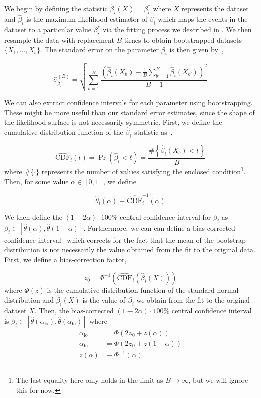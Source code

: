 We begin by defining the statistic $\hat{\beta}_i(X) = \beta_i^*$ where $X$ represents the dataset and $\hat{\beta}_i$ is the maximum likelihood estimator of $\beta_i$ which maps the events in the dataset to a particular value $\beta_i^*$ via the fitting process we described in . We then resample the data with replacement $B$ times to obtain bootstrapped datasets $\{X_1,\ldots,X_b\}$. The standard error on the parameter $\beta_i$ is then given by~\cite{Efron1981},

\begin{equation}
  \hat{\sigma}_{\beta_i}^{(B)} = \sqrt{\sum_{b=1}^{B}\frac{\left(\hat{\beta}_i(X_b) - \frac{1}{B}\sum_{b'=1}^{B} \hat{\beta}_i(X_{b'}) \right)^2}{B-1}}
  \label{eq:bootstrap-standard-error}
\end{equation}

We can also extract confidence intervals for each parameter using bootstrapping. These might be more useful than our standard error estimates, since the shape of the likelihood surface is not necessarily symmetric. First, we define the cumulative distribution function of the $\hat{\beta}_i$ statistic as~\cite{Efron1981},

\begin{equation}
  \hat{\text{CDF}}_i(t) = \Pr(\hat{\beta}_i < t) = \frac{\#\left\{\hat{\beta}_i(X_b) < t\right\}}{B}
\end{equation}
where $\#\{\cdot\}$ represents the number of values satisfying the enclosed condition\footnote{The last equality here only holds in the limit as $B\to\infty$, but we will ignore this for now.}. Then, for some value $\alpha \in [0, 1]$, we define

\begin{equation}
  \hat{\theta}_i(\alpha) \equiv \hat{\text{CDF}}_i^{-1}(\alpha)
\end{equation}

We then define the $(1 - 2\alpha)\cdot 100\%$ central confidence interval for $\beta_i$ as $\beta_i \in [\hat{\theta}(\alpha),\hat{\theta}(1 - \alpha)]$. Furthermore, we can can define a bias-corrected confidence interval~\cite{Efron1981} which corrects for the fact that the mean of the bootstrap distribution is not necessarily the value obtained from the fit to the original data. First, we define a bias-correction factor,

\begin{equation}
  z_0 = \Phi^{-1}\left(\hat{\text{CDF}}_i(\hat{\beta}_i(X))\right)
\end{equation}
where $\Phi(z)$ is the cumulative distribution function of the standard normal distribution and $\hat{\beta}_i(X)$ is the value of $\beta_i$ we obtain from the fit to the original dataset $X$. Then, the bias-corrected $(1-2\alpha)\cdot 100\%$ central confidence interval is $\beta_i \in \left[\hat{\theta}(\alpha_\text{lo}),\hat{\theta}(\alpha_\text{hi})\right]$ where
\begin{align}
  \alpha_\text{lo} &= \Phi\left(2z_0 + z(\alpha)\right) \\
  \alpha_\text{hi} &= \Phi\left(2z_0 + z(1-\alpha)\right) \\
  z(\alpha) &\equiv \Phi^{-1}(\alpha)
\end{align}

